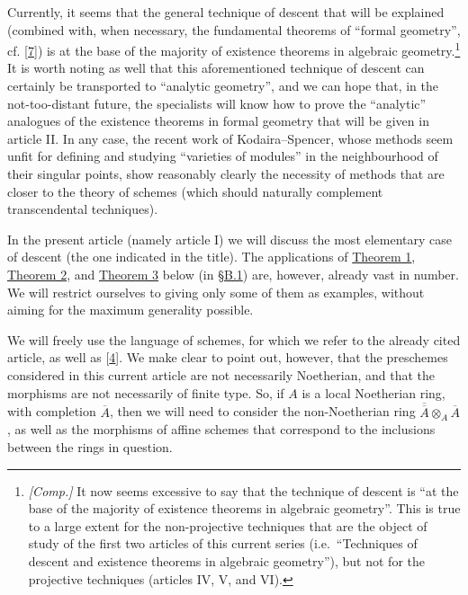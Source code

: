 \documentclass{article}
\newcommand{\oldpage}[1]{\marginpar{\footnotesize$\Big\vert$ \textit{p.~#1}}}
\theoremstyle{definition}
\theoremstyle{definition}
\theoremstyle{definition}
\theoremstyle{definition}
\theoremstyle{remark}
\begin{document}
Currently, it seems that the general technique of descent that will be explained (combined with, when necessary, the fundamental theorems of ``formal geometry'', cf. {[}\protect\hyperlink{ref-Gro1958a}{7}{]}) is at the base of the majority of existence theorems in algebraic geometry.\footnote{\emph{{[}Comp.{]}} It now seems excessive to say that the technique of descent is ``at the base of the majority of existence theorems in algebraic geometry''. This is true to a large extent for the non-projective techniques that are the object of study of the first two articles of this current series (i.e.~``Techniques of descent and existence theorems in algebraic geometry''), but not for the projective techniques (articles IV, V, and VI).}
It is worth noting as well that this aforementioned technique of descent can certainly be transported to ``analytic geometry'', and we can hope that, in the not-too-distant future, the specialists will know how to prove the ``analytic'' analogues of the existence theorems in formal geometry that will be given in article II.
In any case, the recent work of Kodaira--Spencer, whose methods seem unfit for defining and studying ``varieties of modules'' in the neighbourhood of their singular points, show reasonably clearly the necessity of methods that are closer to the theory of schemes (which should naturally complement transcendental techniques).

In the present article (namely article I) we will discuss the most elementary case of descent (the one indicated in the title).
The applications of \protect\hyperlink{fga-3-i-section-B.1-theorem-1}{Theorem 1}, \protect\hyperlink{fga-3-i-section-B.1-theorem-2}{Theorem 2}, and \protect\hyperlink{fga-3-i-section-B.1-theorem-3}{Theorem 3} below (in \protect\hyperlink{fga-3-i-section-B.1}{§B.1}) are, however, already vast in number.
We will restrict ourselves to giving only some of them as examples, without aiming for the maximum generality possible.

We will freely use the language of schemes, for which we refer to the already cited article, as well as {[}\protect\hyperlink{ref-GR1958}{4}{]}.
We make clear to point out, however, that the preschemes considered in this current article are not necessarily Noetherian, and that the morphisms are not necessarily of finite type.
\oldpage{190-02}So, if \(A\) is a local Noetherian ring, with completion \(\overline{A}\), then we will need to consider the non-Noetherian ring \(\overline{\overline{A}}\otimes_A\overline{A}\), as well as the morphisms of affine schemes that correspond to the inclusions between the rings in question.
\end{document}

